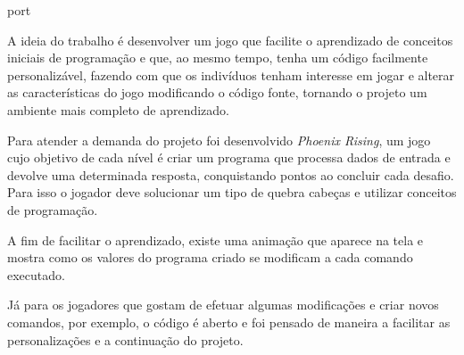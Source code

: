 
\begin{resumo}{port}

    A ideia do trabalho é desenvolver um jogo que facilite o aprendizado de 
    conceitos iniciais de programação e que, ao mesmo tempo, tenha um código 
    facilmente personalizável, fazendo com que os indivíduos tenham
    interesse em jogar e alterar as características do jogo modificando o código
    fonte, tornando o projeto um ambiente mais completo de aprendizado. 

    Para atender a demanda do projeto foi desenvolvido \textit{Phoenix Rising}, 
    um jogo cujo objetivo de cada nível é criar um
    programa que processa dados de entrada e devolve uma determinada
    resposta, conquistando pontos ao concluir cada desafio. Para isso 
    o jogador deve solucionar um tipo de quebra cabeças e utilizar 
    conceitos de programação.
    
    A fim de facilitar o aprendizado, existe uma animação
    que aparece na tela e mostra como os valores do programa criado se
    modificam a cada comando executado.
    
    Já para os jogadores que gostam de efetuar algumas modificações e
    criar novos comandos, por exemplo, o código é aberto e foi pensado 
    de maneira a facilitar as personalizações e a continuação do projeto.

\end{resumo}
    
    
    